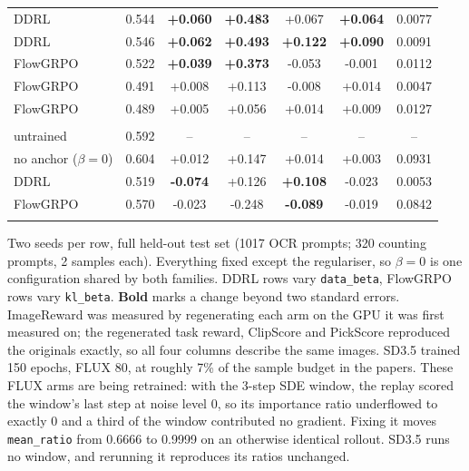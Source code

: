 \documentclass[border=14pt]{standalone}
\begin{document}
\begin{minipage}{\dimexpr 1.02\linewidth}
\begin{tabular}{l S[table-format=1.3] S[table-format=+1.3] S[table-format=+1.3] S[table-format=+1.3] S[table-format=+1.3] S[table-format=1.4]}
DDRL             & 0.544 & \bfseries +0.060 & \bfseries +0.483 & +0.067 & \bfseries +0.064 & 0.0077 \\
DDRL              & 0.546 & \bfseries +0.062 & \bfseries +0.493 & \bfseries +0.122 & \bfseries +0.090 & 0.0091 \\
FlowGRPO          & 0.522 & \bfseries +0.039 & \bfseries +0.373 & -0.053 & -0.001 & 0.0112 \\
FlowGRPO          & 0.491 & +0.008 & +0.113 & -0.008 & +0.014 & 0.0047 \\
FlowGRPO           & 0.489 & +0.005 & +0.056 & +0.014 & +0.009 & 0.0127 \\
\addlinespace[5pt]
\midrule
{} \\
\addlinespace[2pt]
untrained                & 0.592 & {--} & {--} & {--} & {--} & {--} \\
no anchor ($\beta=0$)    & 0.604 & +0.012 & +0.147 & +0.014 & +0.003 & 0.0931 \\
DDRL             & 0.519 & \bfseries -0.074 & +0.126 & \bfseries +0.108 & -0.023 & 0.0053 \\
FlowGRPO          & 0.570 & -0.023 & -0.248 & \bfseries -0.089 & -0.019 & 0.0842 \\
\addlinespace[5pt]
\bottomrule
\end{tabular}

\vspace{7pt}
{\footnotesize\textcolor{hdr}{%
Two seeds per row, full held-out test set (1017 OCR prompts; 320 counting
prompts, 2 samples each). Everything fixed except the regulariser, so
$\beta=0$ is one configuration shared by both families. DDRL rows vary
\texttt{data\_beta}, FlowGRPO rows vary \texttt{kl\_beta}. \textbf{Bold} marks
a change beyond two standard errors. ImageReward was measured by regenerating
each arm on the GPU it was first measured on; the regenerated task reward,
ClipScore and PickScore reproduced the originals exactly, so all four columns
describe the same images. SD3.5 trained 150 epochs, FLUX 80, at roughly 7\% of
the sample budget in the papers. These FLUX arms are being retrained: with the
3-step SDE window, the replay scored the window's last step at noise level 0,
so its importance ratio underflowed to exactly 0 and a third of the window
contributed no gradient. Fixing it moves \texttt{mean\_ratio} from 0.6666 to
0.9999 on an otherwise identical rollout. SD3.5 runs no window, and rerunning
it reproduces its ratios unchanged.%
}}
\end{minipage}
\end{document}
